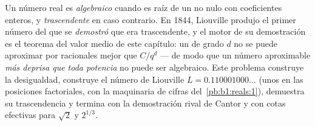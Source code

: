\begin{problem}
\label{pb:b1:derivative:1}
Un número real es \emph{algebraico} cuando es raíz de un 
no nulo con coeficientes enteros, y \emph{trascendente} en caso
contrario. En 1844, Liouville produjo el primer número del que se
\emph{demostró} que era trascendente, y el motor de su demostración es
el teorema del valor medio de este capítulo: un  de
grado $d$ no se puede aproximar por racionales mejor que $C/q^d$ ---
de modo que un número aproximable \emph{más deprisa que toda potencia}
no puede ser algebraico. Este problema construye la desigualdad,
construye el número de Liouville $L = 0.110001000\dots$ (unos en las
posiciones factoriales, con la maquinaria de cifras
del~\cref{pb:b1:reals:1}), demuestra su trascendencia y termina con la
demostración rival de Cantor y con cotas efectivas para $\sqrt2$ y
$2^{1/3}$.


\end{problem}

